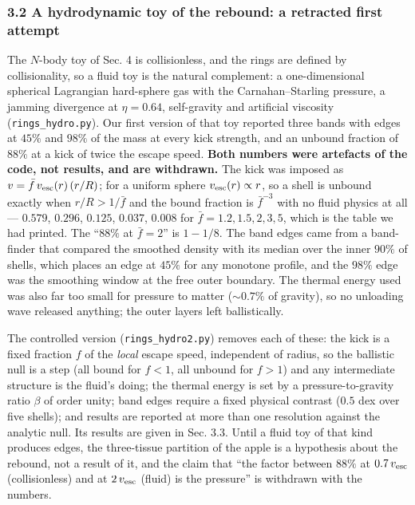 \documentclass[
  11pt,
]{article}
\begin{document}
\hypertarget{a-hydrodynamic-toy-of-the-rebound-a-retracted-first-attempt}{%
\subsubsection{\texorpdfstring{\textbf{3.2 A hydrodynamic toy of the
rebound: a retracted first
attempt}}{3.2 A hydrodynamic toy of the rebound: a retracted first attempt}}\label{a-hydrodynamic-toy-of-the-rebound-a-retracted-first-attempt}}

The \(N\)-body toy of Sec. 4 is collisionless, and the rings are defined
by collisionality, so a fluid toy is the natural complement: a
one-dimensional spherical Lagrangian hard-sphere gas with the
Carnahan--Starling pressure, a jamming divergence at \(\eta = 0.64\),
self-gravity and artificial viscosity (\texttt{rings\_hydro.py}). Our
first version of that toy reported three bands with edges at \(45\%\)
and \(98\%\) of the mass at every kick strength, and an unbound fraction
of \(88\%\) at a kick of twice the escape speed. \textbf{Both numbers
were artefacts of the code, not results, and are withdrawn.} The kick
was imposed as \(v = \bar{f}\,v_{\rm esc}(r)\,(r/R)\); for a uniform
sphere \(v_{\rm esc}(r) \propto r\), so a shell is unbound exactly when
\(r/R > 1/\bar{f}\) and the bound fraction is \(\bar{f}^{-3}\) with no
fluid physics at all --- \(0.579\), \(0.296\), \(0.125\), \(0.037\),
\(0.008\) for \(\bar{f} = 1.2, 1.5, 2, 3, 5\), which is the table we had
printed. The ``\(88\%\) at \(\bar{f} = 2\)'' is \(1 - 1/8\). The band
edges came from a band-finder that compared the smoothed density with
its median over the inner \(90\%\) of shells, which places an edge at
\(45\%\) for any monotone profile, and the \(98\%\) edge was the
smoothing window at the free outer boundary. The thermal energy used was
also far too small for pressure to matter (\(\sim\!0.7\%\) of gravity),
so no unloading wave released anything; the outer layers left
ballistically.

The controlled version (\texttt{rings\_hydro2.py}) removes each of
these: the kick is a fixed fraction \(f\) of the \emph{local} escape
speed, independent of radius, so the ballistic null is a step (all bound
for \(f<1\), all unbound for \(f>1\)) and any intermediate structure is
the fluid's doing; the thermal energy is set by a pressure-to-gravity
ratio \(\beta\) of order unity; band edges require a fixed physical
contrast (\(0.5\) dex over five shells); and results are reported at
more than one resolution against the analytic null. Its results are
given in Sec. 3.3. Until a fluid toy of that kind produces edges, the
three-tissue partition of the apple is a hypothesis about the rebound,
not a result of it, and the claim that ``the factor between \(88\%\) at
\(0.7\,v_{\rm esc}\) (collisionless) and at \(2\,v_{\rm esc}\) (fluid)
is the pressure'' is withdrawn with the numbers.
\end{document}
